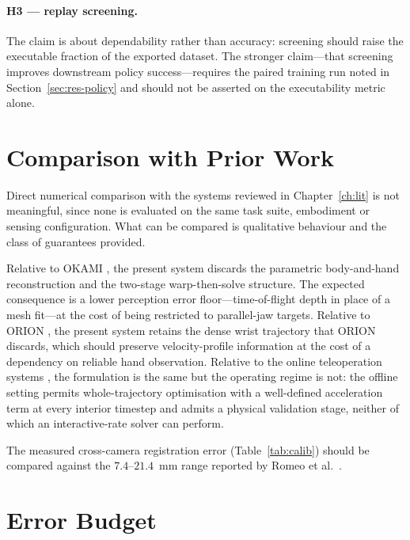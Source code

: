 \paragraph{H3 --- replay screening.} The claim is about dependability rather
than accuracy: screening should raise the executable fraction of the exported
dataset.  The stronger claim---that screening improves
downstream policy success---requires the paired training run noted in
Section~\ref{sec:res-policy} and should not be asserted on the executability
metric alone.

\section{Comparison with Prior Work}
\label{sec:comparison}

Direct numerical comparison with the systems reviewed in
Chapter~\ref{ch:lit} is not meaningful, since none is evaluated on the same
task suite, embodiment or sensing configuration. What can be compared is
qualitative behaviour and the class of guarantees provided.

Relative to OKAMI \cite{okami}, the present system discards the parametric
body-and-hand reconstruction and the two-stage warp-then-solve structure. The
expected consequence is a lower perception error floor---time-of-flight depth
in place of a mesh fit---at the cost of being restricted to parallel-jaw
targets. Relative to ORION \cite{orion}, the present system retains the dense
wrist trajectory that ORION discards, which should preserve velocity-profile
information at the cost of a dependency on reliable hand observation. Relative
to the online teleoperation systems \cite{anyteleop, opentv, ace}, the
formulation is the same but the operating regime is not: the offline setting
permits whole-trajectory optimisation with a well-defined acceleration term at
every interior timestep and admits a physical validation stage, neither of
which an interactive-rate solver can perform.

The measured cross-camera registration error
(Table~\ref{tab:calib}) should be compared against the $7.4$--$21.4$~mm range
reported by Romeo et al.\ \cite{romeo}. 

\section{Error Budget}
\label{sec:errbudget}

